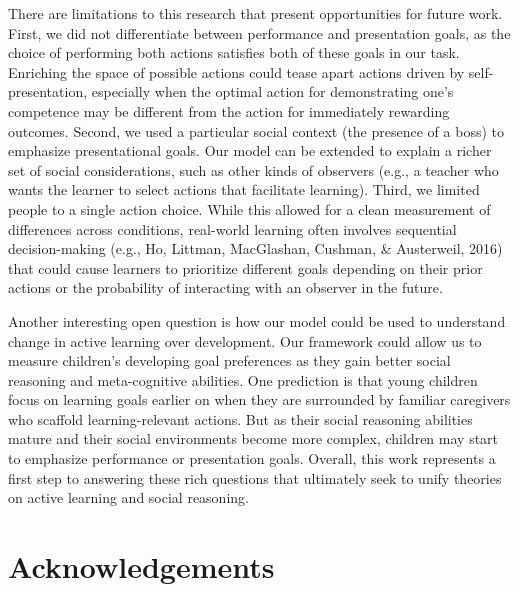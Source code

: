 \documentclass[10pt, letterpaper]{article}
\begin{document}
There are limitations to this research that present opportunities for
future work. First, we did not differentiate between performance and
presentation goals, as the choice of performing both actions satisfies
both of these goals in our task. Enriching the space of possible actions
could tease apart actions driven by self-presentation, especially when
the optimal action for demonstrating one's competence may be different
from the action for immediately rewarding outcomes. Second, we used a
particular social context (the presence of a boss) to emphasize
presentational goals. Our model can be extended to explain a richer set
of social considerations, such as other kinds of observers (e.g., a
teacher who wants the learner to select actions that facilitate
learning). Third, we limited people to a single action choice. While
this allowed for a clean measurement of differences across conditions,
real-world learning often involves sequential decision-making (e.g., Ho,
Littman, MacGlashan, Cushman, \& Austerweil, 2016) that could cause
learners to prioritize different goals depending on their prior actions
or the probability of interacting with an observer in the future.

Another interesting open question is how our model could be used to
understand change in active learning over development. Our framework
could allow us to measure children's developing goal preferences as they
gain better social reasoning and meta-cognitive abilities. One
prediction is that young children focus on learning goals earlier on
when they are surrounded by familiar caregivers who scaffold
learning-relevant actions. But as their social reasoning abilities
mature and their social environments become more complex, children may
start to emphasize performance or presentation goals. Overall, this work
represents a first step to answering these rich questions that
ultimately seek to unify theories on active learning and social
reasoning.

\vspace{1em}
\vspace{1em} \noindent

\section{Acknowledgements}\label{acknowledgements}
\end{document}
